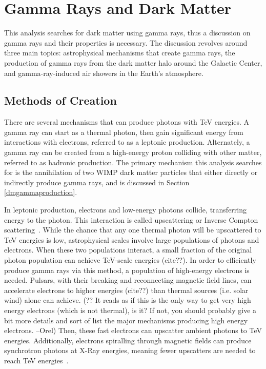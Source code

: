 \cleartooddpage[\thispagestyle{empty}]
\chapter{Gamma Rays and Dark Matter}\label{ch_gamma}


This analysis searches for dark matter using gamma rays, thus a discussion on gamma rays and their properties is necessary.
The discussion revolves around three main topics: astrophysical mechanisms that create gamma rays, the production of gamma rays from the dark matter halo around the Galactic Center, and gamma-ray-induced air showers in the Earth's atmosphere.

\section{Methods of Creation}

  There are several mechanisms that can produce photons with TeV energies.
  A gamma ray can start as a thermal photon, then gain significant energy from interactions with electrons, referred to as a leptonic production.
  Alternately, a gamma ray can be created from a high-energy proton colliding with other matter, referred to as hadronic production.
  The primary mechanism this analysis searches for is the annihilation of two WIMP dark matter particles that either directly or indirectly produce gamma rays, and is discussed in Section \ref{dmgammaproduction}.

  In leptonic production, electrons and low-energy photons collide, transferring energy to the photon.
  This interaction is called upscattering or Inverse Compton scattering~\cite{compton_effect}.
  While the chance that any one thermal photon will be upscattered to TeV energies is low, astrophysical scales involve large populations of photons and electrons.
  When these two populations interact, a small fraction of the original photon population {\color{red}can achieve TeV-scale energies (cite??)}.
  In order to efficiently produce gamma rays via this method, a population of high-energy electrons is needed.
  Pulsars, with their breaking and reconnecting magnetic field lines, {\color{red}can accelerate electrons to higher energies (cite??)} than thermal sources (i.e. solar wind) alone can achieve.
  {\color{red}(?? It reads as if this is the only way to get very high energy electrons (which is not thermal), is it? If not, you should probably give a bit more details and sort of list the major mechanisms producing high energy electrons. --Orel)}
  Then, these fast electrons can upscatter ambient photons to TeV energies.
  Additionally, electrons spiralling through magnetic fields can produce synchrotron photons at X-Ray energies, meaning fewer upscatters are needed to reach TeV energies~\cite{self_compton}.

